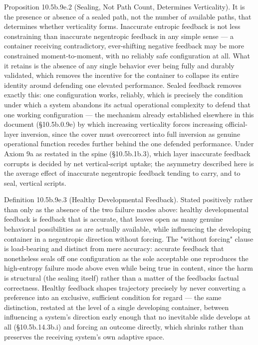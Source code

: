\documentclass[
]{article}
\begin{document}
Proposition 10.5b.9e.2 (Sealing, Not Path Count, Determines
Verticality). It is the presence or absence of a sealed path, not the
number of available paths, that determines whether verticality forms.
Inaccurate entropic feedback is not less constraining than inaccurate
negentropic feedback in any simple sense --- a container receiving
contradictory, ever-shifting negative feedback may be more constrained
moment-to-moment, with no reliably safe configuration at all. What it
retains is the absence of any single behavior ever being fully and
durably validated, which removes the incentive for the container to
collapse its entire identity around defending one elevated performance.
Sealed feedback removes exactly this: one configuration works, reliably,
which is precisely the condition under which a system abandons its
actual operational complexity to defend that one working configuration
--- the mechanism already established elsewhere in this document
(§10.5b.0.9e) by which increasing verticality forces increasing
official-layer inversion, since the cover must overcorrect into full
inversion as genuine operational function recedes further behind the one
defended performance. Under Axiom 9a as restated in the spine
(§10.5b.1b.3), which layer inaccurate feedback corrupts is decided by
net vertical-script uptake; the asymmetry described here is the average
effect of inaccurate negentropic feedback tending to carry, and to seal,
vertical scripts.

Definition 10.5b.9e.3 (Healthy Developmental Feedback). Stated
positively rather than only as the absence of the two failure modes
above: healthy developmental feedback is feedback that is accurate, that
leaves open as many genuine behavioral possibilities as are actually
available, while influencing the developing container in a negentropic
direction without forcing. The "without forcing" clause is load-bearing
and distinct from mere accuracy: accurate feedback that nonetheless
seals off one configuration as the sole acceptable one reproduces the
high-entropy failure mode above even while being true in content, since
the harm is structural (the sealing itself) rather than a matter of the
feedbacks factual correctness. Healthy feedback shapes trajectory
precisely by never converting a preference into an exclusive, sufficient
condition for regard --- the same distinction, restated at the level of
a single developing container, between influencing a system's direction
early enough that no inevitable slide develops at all (§10.5b.14.3b.i)
and forcing an outcome directly, which shrinks rather than preserves the
receiving system's own adaptive space.
\end{document}

